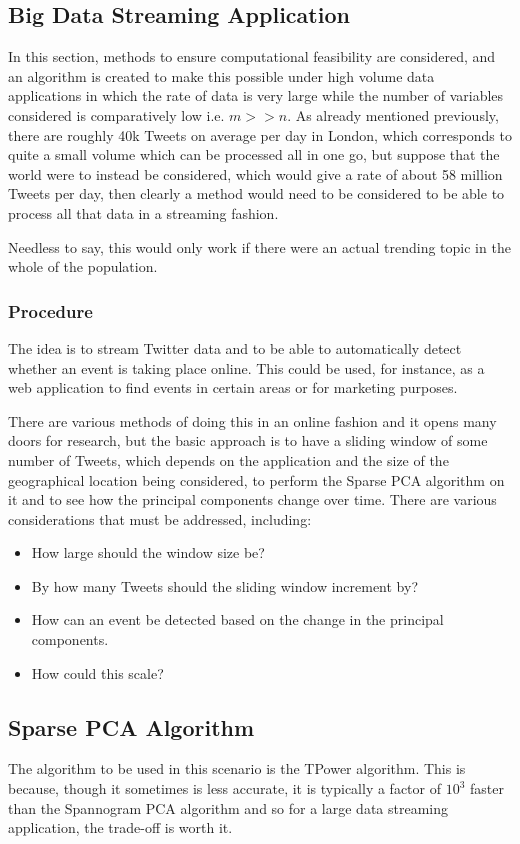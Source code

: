 \documentclass[11pt,a4paper]{article}
\begin{document}
\subsection{Big Data Streaming Application}
In this section, methods to ensure computational feasibility are considered, and an algorithm is created to make this possible under high volume data applications in which the rate of data is very large while the number of variables considered is comparatively low i.e. $m >> n$. As already mentioned previously, there are roughly 40k Tweets on average per day in London, which corresponds to quite a small volume which can be processed all in one go, but suppose that the world were to instead be considered, which would give a rate of about 58 million Tweets per day, then clearly a method would need to be considered to be able to process all that data in a streaming fashion. 

Needless to say, this would only work if there were an actual trending topic in the whole of the population. 
\subsubsection{Procedure}
The idea is to stream Twitter data and to be able to automatically detect whether an event is taking place online. This could be used, for instance, as a web application to find events in certain areas or for marketing purposes. 

There are various methods of doing this in an online fashion and it opens many doors for research, but the basic approach is to have a sliding window of some number of Tweets, which depends on the application and the size of the geographical location being considered, to perform the Sparse PCA algorithm on it and to see how the principal components change over time. There are various considerations that must be addressed, including:
\begin{itemize}
\item How large should the window size be?
\item By how many Tweets should the sliding window increment by?
\item How can an event be detected based on the change in the principal components. 
\item How could this scale?
\end{itemize}

\subsection{Sparse PCA Algorithm}
The algorithm to be used in this scenario is the TPower algorithm. This is because, though it sometimes is less accurate, it is typically a factor of $10^3$ faster than the Spannogram PCA algorithm and so for a large data streaming application, the trade-off is worth it. 
\end{document}
